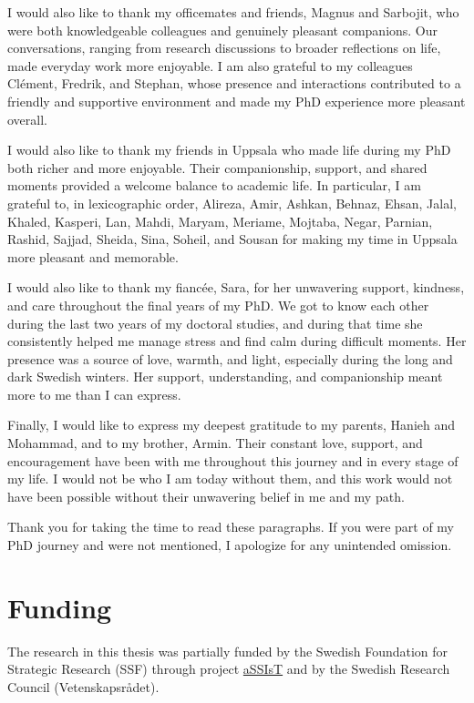 I would also like to thank my officemates and friends, Magnus and Sarbojit, who were both knowledgeable colleagues and genuinely pleasant companions.
Our conversations, ranging from research discussions to broader reflections on life, made everyday work more enjoyable.
I am also grateful to my colleagues Clément, Fredrik, and Stephan, whose presence and interactions contributed to a friendly and supportive environment and made my PhD experience more pleasant overall.

I would also like to thank my friends in Uppsala who made life during my PhD both richer and more enjoyable.
Their companionship, support, and shared moments provided a welcome balance to academic life.
In particular, I am grateful to, in lexicographic order, Alireza, Amir, Ashkan, Behnaz, Ehsan, Jalal, Khaled, Kasperi, Lan, Mahdi, Maryam, Meriame, Mojtaba, Negar, Parnian, Rashid, Sajjad, Sheida, Sina, Soheil, and Sousan for making my time in Uppsala more pleasant and memorable.

I would also like to thank my fiancée, Sara, for her unwavering support, kindness, and care throughout the final years of my PhD.
We got to know each other during the last two years of my doctoral studies, and during that time she consistently helped me manage stress and find calm during difficult moments.
Her presence was a source of love, warmth, and light, especially during the long and dark Swedish winters.
Her support, understanding, and companionship meant more to me than I can express.

Finally, I would like to express my deepest gratitude to my parents, Hanieh and Mohammad, and to my brother, Armin.
Their constant love, support, and encouragement have been with me throughout this journey and in every stage of my life.
I would not be who I am today without them, and this work would not have been possible without their unwavering belief in me and my path.

Thank you for taking the time to read these paragraphs.
If you were part of my PhD journey and were not mentioned, I apologize for any unintended omission.

\section{Funding}

The research in this thesis was partially funded by the Swedish Foundation for Strategic Research (SSF) through project \href{https://assist-project.github.io/}{aSSIsT} and by the Swedish Research Council (Vetenskapsr{\aa}det).
